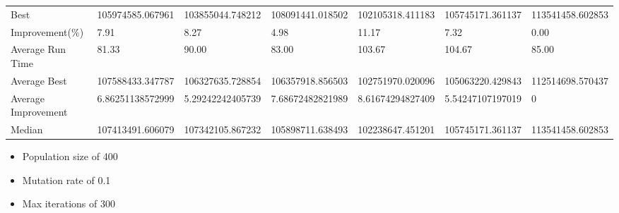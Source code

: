 \begin{table}[H]
{\begin{tabular}{lllllll}
\cellcolor[HTML]{ECF4FF}Best                & 105974585.067961 & 103855044.748212 & 108091441.018502 & 102105318.411183 & 105745171.361137 & 113541458.602853 \\
\cellcolor[HTML]{ECF4FF}Improvement(\%)     & 7.91             & 8.27             & 4.98             & 11.17            & 7.32             & 0.00             \\
\rowcolor[HTML]{CBCEFB} 
\cellcolor[HTML]{DAE8FC}Average Run Time    & 81.33            & 90.00            & 83.00            & 103.67           & 104.67           & 85.00            \\
\rowcolor[HTML]{CBCEFB} 
\cellcolor[HTML]{DAE8FC}Average Best        & 107588433.347787 & 106327635.728854 & 106357918.856503 & 102751970.020096 & 105063220.429843 & 112514698.570437 \\
\rowcolor[HTML]{CBCEFB} 
\cellcolor[HTML]{DAE8FC}Average Improvement & 6.86251138572999 & 5.29242242405739 & 7.68672482821989 & 8.61674294827409 & 5.54247107197019 & 0                \\
\rowcolor[HTML]{CBCEFB} 
\cellcolor[HTML]{DAE8FC}Median              & 107413491.606079 & 107342105.867232 & 105898711.638493 & 102238647.451201 & 105745171.361137 & 113541458.602853
\end{tabular}%
}
\end{table}

\begin{itemize}
  \item Population size of 400
  \item Mutation rate of 0.1
  \item Max iterations of 300
\end{itemize}

